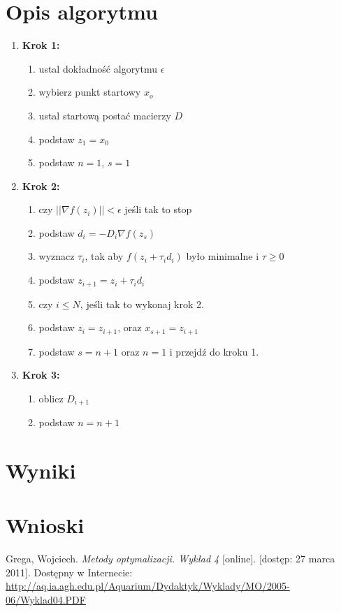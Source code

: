 \documentclass{classrep}
\begin{document}
\section{Opis algorytmu}
\begin{enumerate}
  \item \textbf{Krok 1:}
    \begin{enumerate}
    \item ustal dokładność algorytmu $\epsilon$
    \item wybierz punkt startowy $x_o$
    \item ustal startową postać macierzy $D$
    \item podstaw $z_1 = x_0$
    \item podstaw $n = 1$, $s = 1$
    \end{enumerate}
  \item \textbf{Krok 2:}
    \begin{enumerate}
    \item czy $||\nabla f(z_i)|| < \epsilon $ jeśli tak to stop
    \item podstaw $d_i = -D_i \nabla f(z_s)$
    \item wyznacz $\tau_i$, tak aby $f(z_i + \tau_i d_i)$ było minimalne i $\tau \geq 0$
    \item podstaw $z_{i+1} = z_i + \tau_i d_i$
    \item czy $i \leq N$, jeśli tak to wykonaj krok 2.
    \item podstaw $z_i = z_{i+1}$, oraz $x_{s+1} = z_{i+1}$
    \item podstaw $s = n+1$ oraz $n = 1$ i przejdź do kroku 1.
    \end{enumerate}
  \item \textbf{Krok 3:}
    \begin{enumerate}
    \item oblicz $D_{i+1}$
    \item podstaw $n = n+1$
    \end{enumerate}
\end{enumerate}
\section{Wyniki}

\section{Wnioski}

\begin{thebibliography}{99}
Grega, Wojciech. \textit{Metody optymalizacji. Wykład 4} [online]. [dostęp: 27
marca 2011]. Dostępny w Internecie:
\url{http://aq.ia.agh.edu.pl/Aquarium/Dydaktyk/Wyklady/MO/2005-06/Wyklad04.PDF}
\end{thebibliography}
\end{document}
